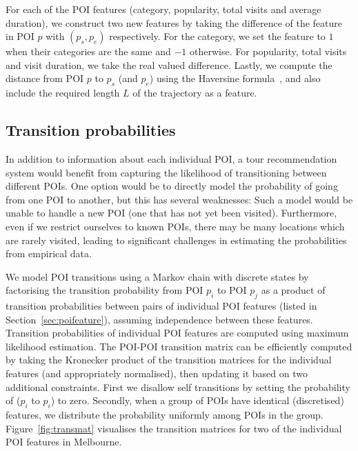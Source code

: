 For each of the POI features (category, popularity, total visits and average duration),
we construct two new features by taking the difference of the feature in POI $p$ with $(p_s, p_e)$ respectively.
For the category, we set the feature to $1$ when their categories are the same and $-1$ otherwise.
For popularity, total visits and visit duration, we take the real valued difference.
Lastly, we compute the distance from POI $p$ to $p_s$ (and $p_e$) using the Haversine formula~\cite{haversine},
and also include the required length $L$ of the trajectory as a feature.



\subsection{Transition probabilities}
\label{sec:transition}

In addition to information about each individual POI, a tour recommendation system would benefit
from capturing the likelihood of transitioning between different POIs. One option would be to
directly model the probability of going from one POI to another, but this has several weaknesses:
Such a model would be unable to handle a new POI (one that has not yet been visited).
Furthermore, even if we restrict ourselves to known POIs, there may be many locations which
are rarely visited, leading to significant challenges in estimating the probabilities from
empirical data.

We model POI transitions using a Markov chain with discrete %
states by factorising the transition probability from POI $p_i$ to POI $p_j$ 
as a product of transition probabilities between pairs of individual POI features (listed in Section~\ref{sec:poifeature}),
assuming independence between these features.
Transition probabilities of individual POI features are computed using maximum likelihood estimation.
The POI-POI transition matrix can be efficiently computed by taking the Kronecker product of
the transition matrices for the individual features (and appropriately normalised), 
then updating it based on two additional constraints.
First we disallow self transitions by setting the probability of ($p_i$ to $p_i$) to zero.
Secondly, when a group of POIs have identical (discretised) features, we distribute the probability uniformly among POIs in the group. 
Figure~\ref{fig:transmat} visualises the transition matrices for two of the individual POI features in Melbourne.

